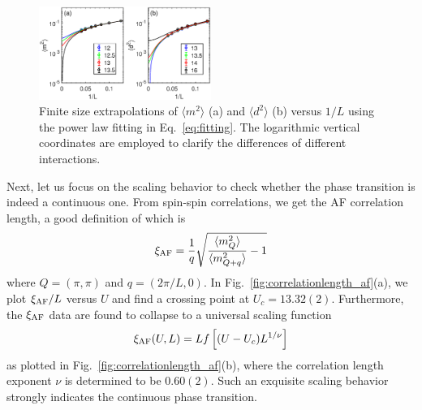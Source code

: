 \documentclass[twocolumn,superscriptaddress,prb]{revtex4-1}
\begin{document}
\begin{figure}
    \includegraphics[width=0.5\textwidth]{extrapolation}
    \caption{\label{fig:extrapolation} Finite size extrapolations of $\langle m^2 \rangle$ (a) and $\langle d^2 \rangle$ (b) versus $1/L$ using the power law fitting in Eq.~\ref{eq:fitting}. The logarithmic vertical coordinates are employed to clarify the differences of different interactions.}
\end{figure}




Next, let us focus on the scaling behavior to check whether the phase transition is indeed a continuous one. From spin-spin correlations, we get the AF correlation length, a good definition of which is \cite{Sandvik_ACP_2010}
\begin{eqnarray}
  \xi_{\rm AF}=\frac{1}{q}\sqrt{\frac{\langle m_Q^2 \rangle}{\langle m_{Q+q}^2 \rangle}-1}
\end{eqnarray}
where $Q=(\pi,\pi)$ and $q=(2\pi/L,0)$. In Fig.~\ref{fig:correlationlength_af}(a), we plot $\xi_{\rm AF}/L$ versus $U$ and find a crossing point at $U_c=13.32(2)$. Furthermore, the $\xi_{\rm AF}$ data are found to collapse to a universal scaling function
\begin{eqnarray}\label{eq:scalinghypothesis}
  \xi_{\rm AF}(U,L)=L f\left[(U-U_c)L^{1/\nu}\right] 
\end{eqnarray}
as plotted in Fig.~\ref{fig:correlationlength_af}(b), where the correlation length exponent $\nu$ is determined to be $0.60(2)$. Such an exquisite scaling behavior strongly indicates the continuous phase transition. 
\end{document}

